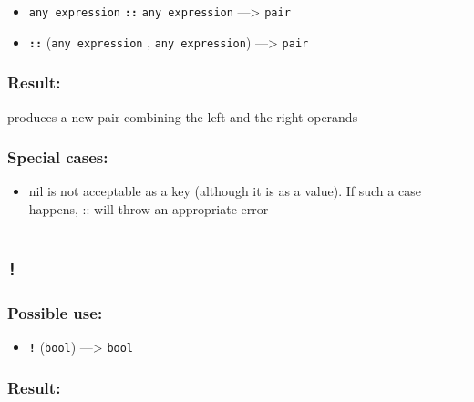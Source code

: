 \documentclass[]{book}
\providecommand{\tightlist}{%
  \setlength{\itemsep}{0pt}\setlength{\parskip}{0pt}}
\theoremstyle{definition}
\theoremstyle{definition}
\theoremstyle{definition}
\theoremstyle{remark}
\begin{document}
\begin{itemize}
\tightlist
\item
  \texttt{any\ expression} \textbf{\texttt{::}} \texttt{any\ expression}
  ---\textgreater{} \texttt{pair}
\item
  \textbf{\texttt{::}} (\texttt{any\ expression} ,
  \texttt{any\ expression}) ---\textgreater{} \texttt{pair}
\end{itemize}

\subsubsection{Result:}\label{result-1}

produces a new pair combining the left and the right operands

\subsubsection{Special cases:}\label{special-cases-1}

\begin{itemize}
\tightlist
\item
  nil is not acceptable as a key (although it is as a value). If such a
  case happens, :: will throw an appropriate error
\end{itemize}

\begin{center}\rule{0.5\linewidth}{\linethickness}\end{center}

\subsection{\texorpdfstring{\texttt{!}}{!}}\label{section-4}

\subsubsection{Possible use:}\label{possible-use-3}

\begin{itemize}
\tightlist
\item
  \textbf{\texttt{!}} (\texttt{bool}) ---\textgreater{} \texttt{bool}
\end{itemize}

\subsubsection{Result:}\label{result-2}
\end{document}
